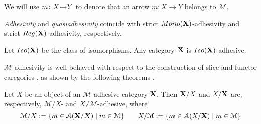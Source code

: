 \documentclass[a4paper,UKenglish,cleveref,pdftex,thm-restate,numberwithinsect,anonymous]{lipics}
\newcommand{\mon}{\mathsf{Mono}}
\newcommand{\reg}{\mathsf{Reg}}
\def\A{\textbf {\textup{A}}}
\newcommand{\mto}[0]{\scalebox{1}{$\rightarrowtail$}}
\def\B{\textbf {\textup{B}}}
\def\C{\textbf {\textup{C}}}
\def\X{\textbf {\textup{X}}}
\newcommand{\comma}[2]{#1\hspace{1pt} {\downarrow}\hspace{1pt} #2}
\newcommand{\cma}[2]{\mathcal{#1}\hspace{1pt} {\downarrow}\hspace{1pt} \mathcal{#2}}
\begin{document}
We will use $m\colon X\mto Y$ to denote that an arrow $m\colon X\to Y$ belongs to $\mathcal{M}$.

\begin{remark}
  \label{rem:salva}
  \emph{Adhesivity} and \emph{quasiadhesivity} 
  \cite{lack2005adhesive,garner2012axioms} coincide with strict
  $\mon(\X) $-adhesivity and strict $\reg(\X)$-adhesivity,
  respectively.
\end{remark}

\begin{example}
  \label{rem:iso}
  Let $\mathsf{Iso(\X)}$ be the class of 
  isomorphisms. Any category $\X$ is $\mathsf{Iso(\X)}$-adhesive.
\end{example}

$\mathcal{M}$-adhesivity is well-behaved with respect to  the construction of slice and functor caregories \cite{mac2013categories}, as shown by the following theorems \cite{ehrig2006fundamentals,lack2005adhesive}.


\begin{theorem}\label{cor:slice}
  Let $X$ be an object of an $\mathcal{M}$-adhesive category
  $\X$. Then $\X/X$ and $X/\X$ are, respectively, $\mathcal{M}/X$-
  and $X/\mathcal{M}$-adhesive, where
  \[\mathcal{M}/X:=\{m\in \mathcal{A}(\X/X) \mid m\in \mathcal{M} \}
    \qquad X/\mathcal{M}:=\{m\in \mathcal{A}(X/\X) \mid m\in
    \mathcal{M} \}
  \]
\end{theorem}
\end{document}
